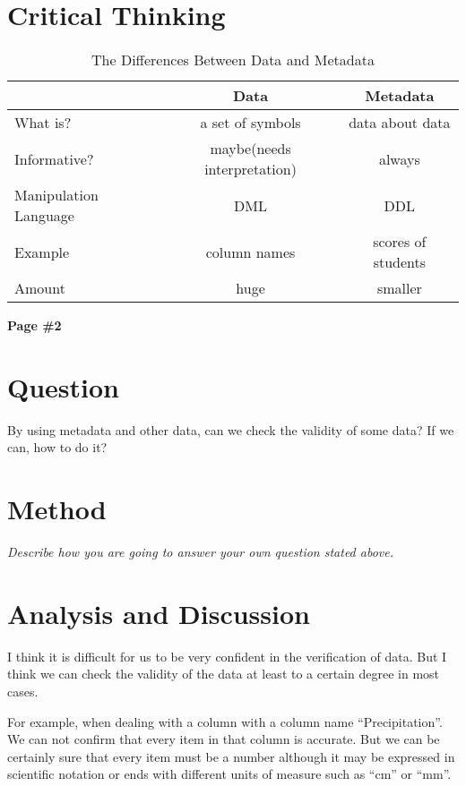 \documentclass[12pt, a4paper]{article}
\begin{document}
\section{Critical Thinking}

\begin{table}[H]
\centering
\caption{The Differences Between Data and Metadata}\label{tab:diff}
\begin{tabular}{lcc}
  \toprule
   &Data &Metadata\\
  \midrule
  What is? &a set of symbols &data about data\\
  Informative? &maybe(needs interpretation) &always\\
  Manipulation Language &DML &DDL\\
  Example &column names &scores of students\\
  Amount &huge &smaller\\
  \bottomrule
\end{tabular}
\end{table}

\newpage

\begin{center}
{\textbf{
Page \#2}}
\end{center}

\section{Question}

By using metadata and other data, can we check the validity of some data? If we can, how to do it?

\section{Method}

{\emph{Describe how you are going to answer your own question stated above.}}

\section{Analysis and Discussion}

I think it is difficult for us to be very confident in the verification of data. But I think we can check the validity of the data at least to a certain degree in most cases.

For example, when dealing with a column with a column name ``Precipitation''. We can not confirm that every item in that column is accurate. But we can be certainly sure that every item must be a number although it may be expressed in scientific notation or ends with different units of measure such as ``cm'' or ``mm''.
\end{document}
